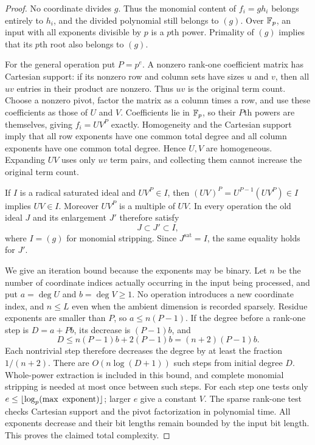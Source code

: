 \begin{proof}
No coordinate divides $g$. Thus the monomial content of $f_i=g h_i$
belongs entirely to $h_i$, and the divided polynomial still belongs
to $(g)$. Over $\mathbb F_p$, an input with all exponents divisible by $p$
is a $p$th power. Primality of $(g)$ implies that its $p$th root
also belongs to $(g)$.

For the general operation put $P=p^e$. A nonzero rank-one coefficient
matrix has Cartesian support: if its nonzero row and column sets have
sizes $u$ and $v$, then all $uv$ entries in their product are nonzero.
Thus $uv$ is the original term count. Choose a nonzero pivot, factor
the matrix as a column times a row, and use these coefficients as those
of $U$ and $V$. Coefficients lie in $\mathbb F_p$, so their $P$th powers are
themselves, giving $f_i=UV^P$ exactly. Homogeneity and the Cartesian
support imply that all row exponents have one common total degree
and all column exponents have one common total degree. Hence $U,V$
are homogeneous. Expanding $UV$ uses only $uv$ term pairs, and
collecting them cannot increase the original term count.

If $I$ is a radical saturated ideal and $UV^P\in I$, then
$(UV)^P=U^{P-1}(UV^P)\in I$ implies $UV\in I$.
Moreover $UV^P$ is a multiple of $UV$. In every operation the old
ideal $J$ and its enlargement $J'$ therefore satisfy
\[
 J\subset J'\subset I,
\]
where $I=(g)$ for monomial stripping. Since $J^{\mathrm{sat}}=I$,
the same equality holds for $J'$.

We give an iteration bound because the exponents may be binary.
Let $n$ be the number of coordinate indices actually occurring in
the input being processed, and put $a=\deg U$ and $b=\deg V\geq1$.
No operation introduces a new coordinate index, and $n\leq L$ even
when the ambient dimension is recorded sparsely. Residue exponents
are smaller than $P$, so $a\leq n(P-1)$. If the degree before a
rank-one step is $D=a+Pb$, its decrease is $(P-1)b$, and
\[
 D\leq n(P-1)b+2(P-1)b=(n+2)(P-1)b.
\]
Each nontrivial step therefore decreases the degree by at least the
fraction $1/(n+2)$. There are $O(n\log(D+1))$ such steps from initial
degree $D$. Whole-power extraction is included in this bound, and
complete monomial stripping is needed at most once between such steps.
For each step one tests only
$e\leq\lfloor\log_p(\max\hbox{ exponent})\rfloor$; larger $e$
give a constant $V$. The sparse rank-one test checks Cartesian support
and the pivot factorization in polynomial time. All exponents decrease
and their bit lengths remain bounded by the input bit length.
This proves the claimed total complexity.
\end{proof}

